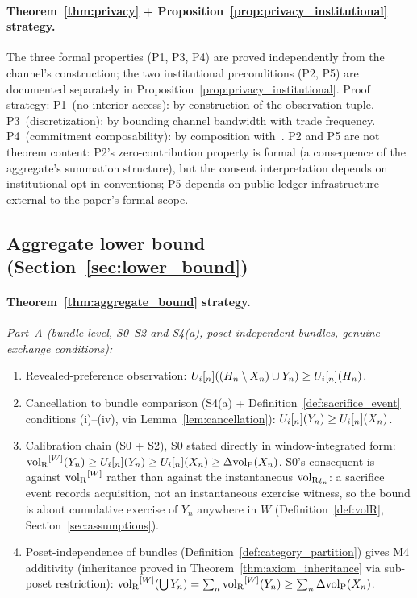 \paragraph{Theorem~\ref{thm:privacy} + Proposition~\ref{prop:privacy_institutional}
strategy.}
The three formal properties (P1, P3, P4) are proved independently
from the channel's construction; the two institutional
preconditions (P2, P5) are documented separately in
Proposition~\ref{prop:privacy_institutional}.  Proof strategy:
P1~(no interior access): by construction of the observation
tuple.
P3~(discretization): by bounding channel bandwidth with trade
frequency.
P4~(commitment composability): by composition
with~\citep[Definition~6]{lasser2026exo}.
P2 and P5 are not theorem content: P2's zero-contribution
property is formal (a consequence of the aggregate's summation
structure), but the consent interpretation depends on
institutional opt-in conventions; P5 depends on public-ledger
infrastructure external to the paper's formal scope.

\subsection{Aggregate lower bound
(Section~\ref{sec:lower_bound})}

\paragraph{Theorem~\ref{thm:aggregate_bound} strategy.}

\emph{Part~A (bundle-level, S0--S2 and S4(a),
poset-independent bundles, genuine-exchange conditions):}
\begin{enumerate}
\item Revealed-preference observation: $U_i[_n]((H_n \setminus
  X_n) \cup Y_n) \geq U_i[_n](H_n)$.
\item Cancellation to bundle comparison (S4(a) +
  Definition~\ref{def:sacrifice_event} conditions (i)--(iv),
  via Lemma~\ref{lem:cancellation}):
  $U_i[_n](Y_n) \geq U_i[_n](X_n)$.
\item Calibration chain (S0 + S2), S0 stated directly in
  window-integrated form:
  ${\operatorname{vol}_{\mathrm{R}}}^{[W]}(Y_n) \geq U_i[_{n}](Y_n) \geq U_i[_{n}](X_n) \geq
  \Delta{\operatorname{vol}_{\mathrm{P}}}(X_n)$.  S0's consequent is against ${\operatorname{vol}_{\mathrm{R}}}^{[W]}$
  rather than against the instantaneous ${\operatorname{vol}_{\mathrm{R}}}_{t_n}$: a
  sacrifice event records acquisition, not an instantaneous
  exercise witness, so the bound is about cumulative exercise of
  $Y_n$ anywhere in $W$ (Definition~\ref{def:volR},
  Section~\ref{sec:assumptions}).
\item Poset-independence of bundles
  (Definition~\ref{def:category_partition}) gives M4 additivity
  (inheritance proved in Theorem~\ref{thm:axiom_inheritance}
  via sub-poset restriction):
  ${\operatorname{vol}_{\mathrm{R}}}^{[W]}(\bigcup Y_n) = \sum_n {\operatorname{vol}_{\mathrm{R}}}^{[W]}(Y_n) \geq
  \sum_n \Delta{\operatorname{vol}_{\mathrm{P}}}(X_n)$.
\end{enumerate}

